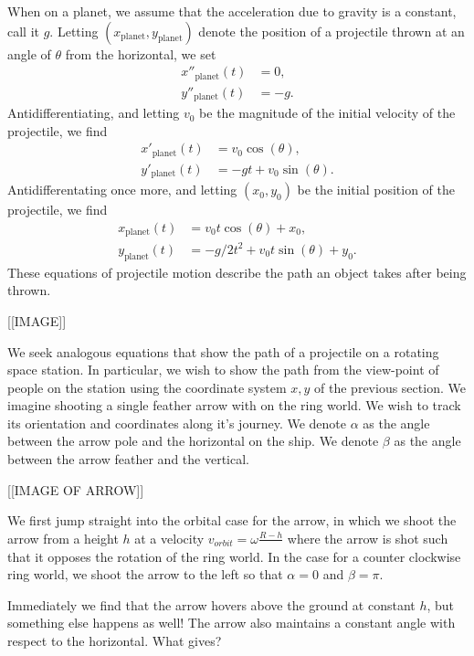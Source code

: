 \documentclass{amsart}
\theoremstyle{definition}
\begin{document}
When on a planet, we assume that the acceleration due to gravity is a
constant, call it $g$. Letting
$(x_{\mathrm{planet}},y_{\mathrm{planet}})$ denote the position
of a projectile thrown at an angle of $\theta$ from the horizontal, we
set
\begin{align*}
  x''_{\mathrm{planet}}(t) &= 0,\\
  y''_{\mathrm{planet}}(t) &= -g.
\end{align*}
Antidifferentiating, and letting $v_0$ be the magnitude of the initial
velocity of the projectile, we find
\begin{align*}
  x'_{\mathrm{planet}}(t) &= v_0 \cos(\theta),\\
  y'_{\mathrm{planet}}(t) &= -g t  + v_0 \sin(\theta).
\end{align*}
Antidifferentating once more, and letting $(x_0,y_0)$ be the
initial position of the projectile, we find
\begin{align*}
  x_{\mathrm{planet}}(t) &=  v_0 t \cos(\theta)  + x_0,\\
  y_{\mathrm{planet}}(t) &=  -g/2 t^2 + v_0 t \sin(\theta)  + y_0.
\end{align*}
These equations of projectile motion describe the path an object takes
after being thrown.

[[IMAGE]]

We seek analogous equations that show the path of a projectile on a
rotating space station. In particular, we wish to show the path from
the view-point of people on the station using the coordinate system $x,y$ of the previous
section. 
\newline
We imagine shooting a single feather arrow with on the ring world. We wish to track its orientation and coordinates along it's journey. We denote $\alpha$ as the 
angle between the arrow pole and the horizontal on the ship. We denote $\beta$ as the angle between the arrow feather and the vertical. 

[[IMAGE OF ARROW]]

We first jump straight into the orbital case for the arrow, in which we shoot the arrow
 from a height $h$ at a velocity $v_{orbit} = \omega \frac{R-h}{}$ where the arrow is 
 shot such that it opposes the rotation of the ring world. In the case for a counter clockwise ring world, we 
 shoot the arrow to the left so that $\alpha=0$ and $\beta = \pi$.

Immediately we find that the arrow hovers above the ground at constant $h$, but something else happens as well! The arrow also maintains a constant angle with respect to the horizontal.
What gives? 
\end{document}
